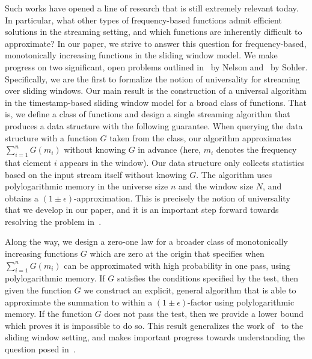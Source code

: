 \documentclass[11pt]{article}
\begin{document}
Such works have opened a line of research
that is still extremely relevant today.  In particular,
what other types of frequency-based functions
admit efficient solutions in the streaming setting, and which functions are inherently difficult to approximate?
In our paper, we strive to answer this question for frequency-based, monotonically increasing
functions in the sliding window model.  We make progress on two significant, open problems
outlined in~\cite{sub30} by Nelson and~\cite{sub20} by Sohler.  Specifically, we are the first
to formalize the notion of universality for streaming over sliding windows.  Our main result is
the construction of a universal algorithm in the timestamp-based sliding window model for a broad class of
functions.  That is, we define a class of functions and design a single
streaming algorithm that produces a data structure with the following guarantee.  When querying
the data structure with a function $G$ taken from the class, our algorithm approximates $\sum_{i=1}^nG(m_i)$
without knowing $G$ in advance (here, $m_i$ denotes the frequency that element $i$ appears in the window).
Our data structure only collects statistics based on
the input stream itself without knowing $G$.  The algorithm uses polylogarithmic memory in the
universe size $n$ and the window size $N$, and obtains a $(1 \pm \epsilon)$-approximation.
This is precisely the notion of universality that we develop in our paper, and
it is an important step forward towards resolving the problem in~\cite{sub30}.

Along the way, we design a zero-one law for a broader class of
monotonically increasing functions $G$ which are zero at the origin that specifies when
$\sum_{i=1}^n G(m_i)$ can be approximated with high probability in one pass, using polylogarithmic memory.
If $G$ satisfies the conditions specified by the test, then given the function $G$ we construct an
explicit, general algorithm that is able to approximate the summation to within a $(1 \pm \epsilon)$-factor
using polylogarithmic memory.  If the function $G$ does not pass the test, then we provide a lower
bound which proves it is impossible to do so.
This result generalizes the work of~\cite{BO10} to the sliding window setting,
and makes important progress towards understanding the question posed in~\cite{sub20}.
\end{document}
